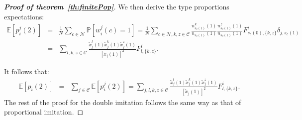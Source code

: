 \documentclass[12pt, onecolumn]{IEEEtran}
\theoremstyle{plain}
\theoremstyle{definition}
\begin{document}
\begin{proof}[\textbf{Proof of theorem~\ref{th:finitePop}}]
We then derive the type proportions expectations:
\begin{eqnarray*}
\mathbb{E}[p_i^j(2)] &=& \frac{1}{N}\sum_{c\in \mathcal{N}}\mathbb{P}[w_i^j(c)=1] = \frac{1}{N}\sum_{c\in \mathcal{N},k,z\in \mathcal{C}} \frac{n_{s_c(1)}^k(1) }{n_{s_c(1)}(1)}\frac{n_{s_c(1)}^{z}(1)}{n_{s_c(1)}(1)}F_{s_c(0),\{k,z\}}^i\delta_{j,s_c(1)} \\
&=& \sum_{l,k,z\in \mathcal{C}} \frac{\tilde{x}_j^l(1)\tilde{x}_j^k(1)\tilde{x}_j^z(1)}{[\tilde{x}_j(1)]^2}F_{l,\{k,z\}}^{i}.
\end{eqnarray*}

It follows that:
\begin{eqnarray*}
\mathbb{E}[p_i(2)]&=&\sum_{j \in \mathcal{C}}\mathbb{E}[p_i^j(2)] = \sum_{j,l,k,z \in \mathcal{C}} \frac{\tilde{x}_j^l(1)\tilde{x}_j^k(1)\tilde{x}_j^z(1)}{[\tilde{x}_j(1)]^2}F_{l,\{k,z\}}^{i}.
\end{eqnarray*}
The rest of the proof for the double imitation follows the same way as that of proportional imitation.
\end{proof}
\end{document}
